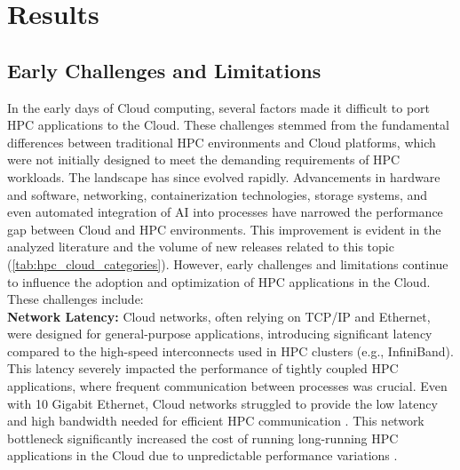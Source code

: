 \section{Results}
\label{sec:results}

\subsection{Early Challenges and Limitations}
\label{sec:earlychallenges}

    In the early days of Cloud computing, several factors made it difficult to port HPC applications to the Cloud. These challenges stemmed from the fundamental differences between traditional HPC environments and Cloud platforms, which were not initially designed to meet the demanding requirements of HPC workloads.
    The landscape has since evolved rapidly. Advancements in hardware and software, networking, containerization technologies, storage systems, and even automated integration of AI into processes have narrowed the performance gap between Cloud and HPC environments. This improvement is evident in the analyzed literature and the volume of new releases related to this topic (\autoref{tab:hpc_cloud_categories}).
    However, early challenges and limitations continue to influence the adoption and optimization of HPC applications in the Cloud. These challenges include: \\

    \noindent
    \textbf{Network Latency:} Cloud networks, often relying on TCP/IP and Ethernet, were designed for general-purpose applications, introducing significant latency compared to the high-speed interconnects used in HPC clusters (e.g., InfiniBand). This latency severely impacted the performance of tightly coupled HPC applications, where frequent communication between processes was crucial. Even with 10 Gigabit Ethernet, Cloud networks struggled to provide the low latency and high bandwidth needed for efficient HPC communication \cite{wang2010cloud}. This network bottleneck significantly increased the cost of running long-running HPC applications in the Cloud due to unpredictable performance variations \cite{gupta2014challenges, marathe2013challenges}. \\


